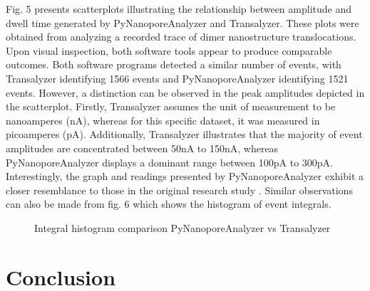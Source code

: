 \documentclass[journal]{IEEEtran}
\begin{document}
Fig. 5 presents scatterplots illustrating the relationship between amplitude and dwell time generated by PyNanoporeAnalyzer and Transalyzer. These plots were obtained from analyzing a recorded trace of dimer nanostructure translocations. Upon visual inspection, both software tools appear to produce comparable outcomes. Both software programs detected a similar number of events, with Transalyzer identifying 1566 events and PyNanoporeAnalyzer identifying 1521 events. However, a distinction can be observed in the peak amplitudes depicted in the scatterplot. Firstly, Transalyzer assumes the unit of measurement to be nanoamperes (nA), whereas for this specific dataset, it was measured in picoamperes (pA). Additionally, Transalyzer illustrates that the majority of event amplitudes are concentrated between 50nA to 150nA, whereas PyNanoporeAnalyzer displays a dominant range between 100pA to 300pA. Interestingly, the graph and readings presented by PyNanoporeAnalyzer exhibit a closer resemblance to those in the original research study \cite{confederatNanoporeFingerprintingSupramolecular2022}. Similar observations can also be made from fig. 6 which shows the histogram of event integrals.

\begin{figure}
  \centering
  \caption{Integral histogram comparison PyNanoporeAnalyzer vs Transalyzer}
\end{figure}

\section{Conclusion}
\end{document}
